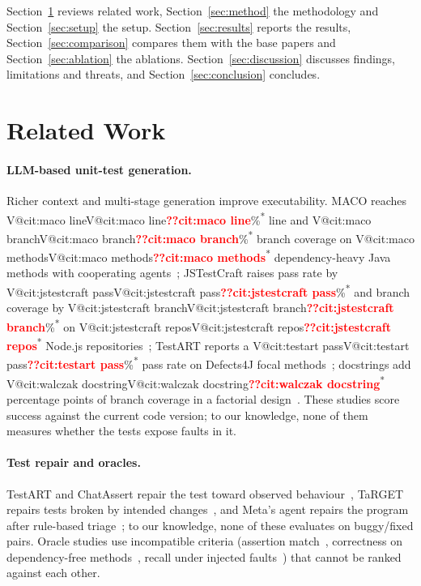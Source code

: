 \documentclass[pdflatex,iicol,sn-mathphys-num]{sn-jnl}
\makeatletter
\newcommand{\V}[1]{\ifcsname V@#1\endcsname\csname V@#1\endcsname\else\textbf{\textcolor{red}{??#1}}\fi}
\newcommand{\cited}{\textsuperscript{*}}
\makeatother
\begin{document}
Section~\ref{sec:related} reviews related work, Section~\ref{sec:method} the methodology and Section~\ref{sec:setup} the setup. Section~\ref{sec:results} reports the results, Section~\ref{sec:comparison} compares them with the base papers and Section~\ref{sec:ablation} the ablations. Section~\ref{sec:discussion} discusses findings, limitations and threats, and Section~\ref{sec:conclusion} concludes.

\section{Related Work}\label{sec:related}

\paragraph{LLM-based unit-test generation.} Richer context and multi-stage generation improve executability. MACO reaches \V{cit:maco line}\%\cited{} line and \V{cit:maco branch}\%\cited{} branch coverage on \V{cit:maco methods}\cited{} dependency-heavy Java methods with cooperating agents~\cite{xie2026maco}; JSTestCraft raises pass rate by \V{cit:jstestcraft pass}\%\cited{} and branch coverage by \V{cit:jstestcraft branch}\%\cited{} on \V{cit:jstestcraft repos}\cited{} Node.js repositories~\cite{liu2026jstestcraft}; TestART reports a \V{cit:testart pass}\%\cited{} pass rate on Defects4J focal methods~\cite{gu2026testart}; docstrings add \V{cit:walczak docstring}\cited{} percentage points of branch coverage in a factorial design~\cite{walczak2026context}. These studies score success against the current code version; to our knowledge, none of them measures whether the tests expose faults in it.

\paragraph{Test repair and oracles.} TestART and ChatAssert repair the test toward observed behaviour~\cite{gu2026testart,hayet2025chatassert}, TaRGET repairs tests broken by intended changes~\cite{yaraghi2025target}, and Meta's agent repairs the program after rule-based triage~\cite{maddila2026agentic}; to our knowledge, none of these evaluates on buggy/fixed pairs. Oracle studies use incompatible criteria (assertion match~\cite{hayet2025chatassert}, correctness on dependency-free methods~\cite{xu2026candor}, recall under injected faults~\cite{li2026mitgen}) that cannot be ranked against each other.
\end{document}
